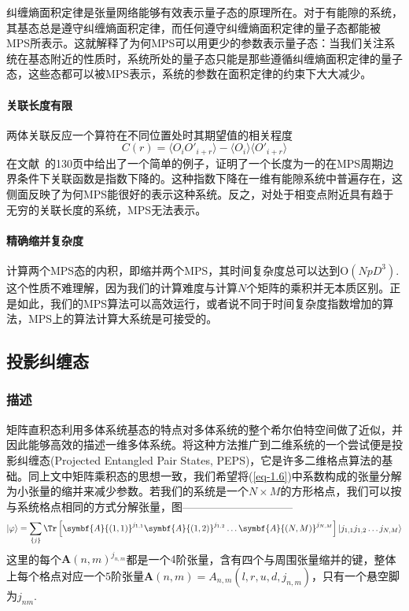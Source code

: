 纠缠熵面积定律是张量网络能够有效表示量子态的原理所在。对于有能隙的系统，其基态总是遵守纠缠熵面积定律，而任何遵守纠缠熵面积定律的量子态都能被MPS所表示\cite{eisertEntanglementTensorNetwork2013}。这就解释了为何MPS可以用更少的参数表示量子态：当我们关注系统在基态附近的性质时，系统所处的量子态只能是那些遵循纠缠熵面积定律的量子态，这些态都可以被MPS表示，系统的参数在面积定律的约束下大大减少。

\paragraph{关联长度有限}

两体关联反应一个算符在不同位置处时其期望值的相关程度
\begin{equation}
C(r) = \langle O_i O'_{i+r}\rangle - \langle O_i\rangle\langle O'_{i+r}\rangle
\end{equation}
在文献~的130页中给出了一个简单的例子，证明了一个长度为一的在MPS周期边界条件下关联函数是指数下降的。这种指数下降在一维有能隙系统中普遍存在，这侧面反映了为何MPS能很好的表示这种系统。反之，对处于相变点附近具有趋于无穷的关联长度的系统，MPS无法表示。

\paragraph{精确缩并复杂度}

计算两个MPS态的内积，即缩并两个MPS，其时间复杂度总可以达到$\mathrm{O}(NpD^3)$. 这个性质不难理解，因为我们的计算难度与计算$N$个矩阵的乘积并无本质区别。正是如此，我们的MPS算法可以高效运行，或者说不同于时间复杂度指数增加的算法，MPS上的算法计算大系统是可接受的。

\subsection{投影纠缠态}
\subsubsection{描述}

矩阵直积态利用多体系统基态的特点对多体系统的整个希尔伯特空间做了近似，并因此能够高效的描述一维多体系统。将这种方法推广到二维系统的一个尝试便是投影纠缠态(Projected Entangled Pair States, PEPS)，它是许多二维格点算法的基础。同上文中矩阵乘积态的思想一致，我们希望将(\ref{eq-1.6})中系数构成的张量分解为小张量的缩并来减少参数。若我们的系统是一个$N\times M$的方形格点，我们可以按与系统格点相同的方式分解张量，图——————————
\begin{equation}\label{PEPS_PBC}
\ket{\varphi} = \sum_{\{j\}} \Tr\left[ \symbf{A}{(1,1)}^{j_{1,1}} \symbf{A}{(1,2)}^{j_{1,2}}\dots \symbf{A}{(N,M)}^{j_{N,M}} \right]\ket{j_{1,1} j_{1,2}\dots j_{N,M}}
\end{equation}
这里的每个$\symbf{A}{(n,m)}^{j_{n,m}}$都是一个$4$阶张量，含有四个与周围张量缩并的键，整体上每个格点对应一个$5$阶张量$\symbf{A}{(n,m)} = A_{n,m}(l,r,u,d,j_{n,m})$，只有一个悬空脚为$j_{nm}$.

